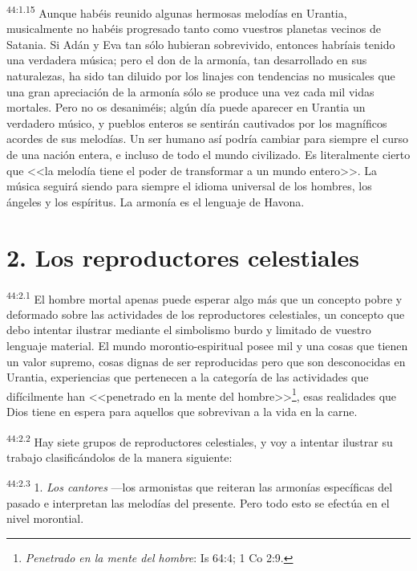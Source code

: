 \par
\textsuperscript{44:1.15} Aunque habéis reunido algunas hermosas melodías en Urantia, musicalmente no habéis progresado tanto como vuestros planetas vecinos de Satania. Si Adán y Eva tan sólo hubieran sobrevivido, entonces habríais tenido una verdadera música; pero el don de la armonía, tan desarrollado en sus naturalezas, ha sido tan diluido por los linajes con tendencias no musicales que una gran apreciación de la armonía sólo se produce una vez cada mil vidas mortales. Pero no os desaniméis; algún día puede aparecer en Urantia un verdadero músico, y pueblos enteros se sentirán cautivados por los magníficos acordes de sus melodías. Un ser humano así podría cambiar para siempre el curso de una nación entera, e incluso de todo el mundo civilizado. Es literalmente cierto que <<la melodía tiene el poder de transformar a un mundo entero>>. La música seguirá siendo para siempre el idioma universal de los hombres, los ángeles y los espíritus. La armonía es el lenguaje de Havona.

\section*{2. Los reproductores celestiales}
\par
\textsuperscript{44:2.1} El hombre mortal apenas puede esperar algo más que un concepto pobre y deformado sobre las actividades de los reproductores celestiales, un concepto que debo intentar ilustrar mediante el simbolismo burdo y limitado de vuestro lenguaje material. El mundo morontio-espiritual posee mil y una cosas que tienen un valor supremo, cosas dignas de ser reproducidas pero que son desconocidas en Urantia, experiencias que pertenecen a la categoría de las actividades que difícilmente han <<penetrado en la mente del hombre>>\footnote{\textit{Penetrado en la mente del hombre}: Is 64:4; 1 Co 2:9.}, esas realidades que Dios tiene en espera para aquellos que sobrevivan a la vida en la carne.

\par
\textsuperscript{44:2.2} Hay siete grupos de reproductores celestiales, y voy a intentar ilustrar su trabajo clasificándolos de la manera siguiente:

\par
\textsuperscript{44:2.3} 1. \textit{Los cantores} ---los armonistas que reiteran las armonías específicas del pasado e interpretan las melodías del presente. Pero todo esto se efectúa en el nivel morontial.


